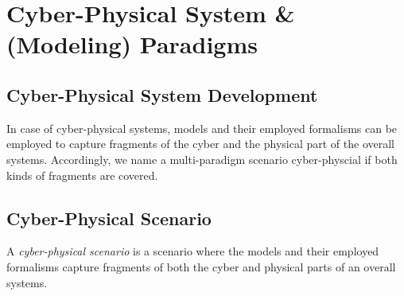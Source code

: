 \section{Cyber-Physical System \& (Modeling) Paradigms}	
\subsection{Cyber-Physical System Development}

In case of cyber-physical systems, models and their employed formalisms can be employed to capture fragments of the cyber and the physical part of the overall systems. Accordingly, we name a multi-paradigm scenario cyber-physcial if both kinds of fragments are covered. 

\subsection{Cyber-Physical Scenario}

\begin{definition}
A \emph{cyber-physical scenario} is a scenario where the models and their employed formalisms capture fragments of both the cyber and  physical parts of an overall systems. 
\end{definition}
